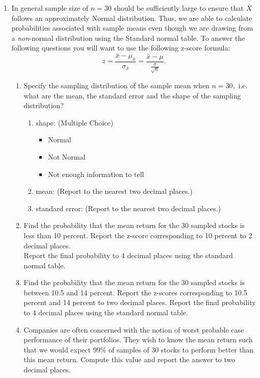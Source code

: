 \begin{enumerate}
\item In general sample size of $n=30$ should be sufficiently large to ensure that $\bar{X}$ follows an approximately Normal distribution. Thus, we are able to calculate probabilities associated with sample means even though we are drawing from a  \emph{non}-normal distribution using the Standard normal table. To answer the following questions you will want to use the following z-score formula:
\begin{equation*}
 z=\frac{\bar{x}-\mu_{\bar{x}}}{\sigma_{\bar{x}}}=\frac{\bar{x}-\mu}{\frac{\sigma}{\sqrt{n}}}.
\end{equation*}
\begin{enumerate}
\item Specify the sampling distribution of the sample mean when $n=30,$ i.e. what are the mean, the standard error and the shape of the sampling distribution?\\
\begin{enumerate}
\item shape: (Multiple Choice)
\begin{itemize}
	\item Normal
	\item Not Normal
	\item Not enough information to tell
\end{itemize}
\item mean: \underline{\hspace{2cm}} \hfill  (Report to the nearest two decimal places.)
\item standard error: \underline{\hspace{2cm}} \hfill (Report to the nearest two decimal places.) \\
\end{enumerate}
\item Find the probability that the mean return for the 30 sampled
stocks is less than 10 percent. Report the z-score corresponding to 10 percent to 2 decimal places.\\ Report the final probability to 4 decimal places using the standard normal table.\\
\item Find the probability that the mean return for the 30 sampled
stocks is between 10.5 and 14 percent. Report the z-scores corresponding to 10.5 percent and 14 percent to two decimal places. Report the final probability to 4 decimal places using the standard normal table.\\
\item Companies are often concerned with the notion of worst probable case performance of their portfolios. They wish to know the mean return such that we would expect 99\% of samples of 30 stocks to perform better than this mean return. Compute this value and report the answer to two decimal places. \\
\end{enumerate}
\end{enumerate}